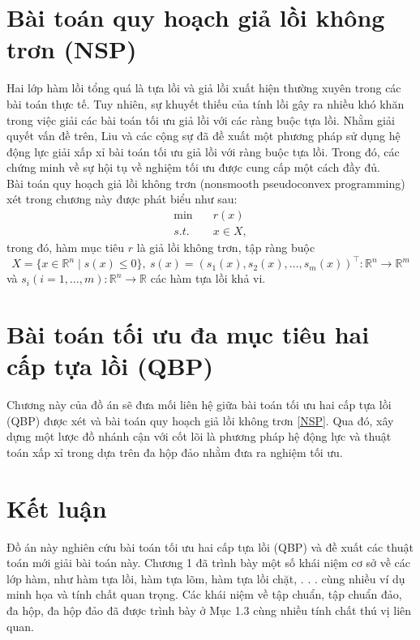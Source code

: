 \documentclass[oneside, a4paper]{book}
\theoremstyle{plain}
\theoremstyle{definition}
\theoremstyle{remark}
\begin{document}
\chapter{Bài toán quy hoạch giả lồi không trơn (NSP)}
Hai lớp hàm lồi tổng quá là tựa lồi và giả lồi xuất hiện thường xuyên trong các bài toán thực tế. Tuy nhiên, sự khuyết thiếu của tính lồi gây ra nhiều khó khăn trong việc giải các bài toán tối ưu giả lồi với các ràng buộc tựa lồi. Nhằm giải quyết vấn đề trên, Liu và các cộng sự \cite{Liu2021} đã đề xuất một phương pháp sử dụng hệ động lực giải xấp xỉ bài toán tối ưu giả lồi với ràng buộc tựa lồi. Trong đó, các chứng minh về sự hội tụ về nghiệm tối ưu được cung cấp một cách đầy đủ. \\
\indent Bài toán quy hoạch giả lồi không trơn (nonsmooth pseudoconvex programming) xét trong chương này được phát biểu như sau:
	\begin{align*}
	\tag*{NSP}
	\label{NSP}
    	\min\quad &r(x)   \\ 
    	s.t. \quad & x \in X,\nonumber 
	\end{align*}
trong đó, hàm mục tiêu $r$ là giả lồi không trơn, tập ràng buộc 
\begin{equation}
	\label{constraints_1}
	X = \{x \in \mathbb{R}^n\mid s(x)\leq 0\},\ s(x)=\left(s_1(x), s_2(x), \ldots, s_m(x)\right)^{\top}:\mathbb{R}^n \rightarrow \mathbb{R}^m
\end{equation}
 và $s_i(i=1, \ldots, m): \mathbb{R}^n \rightarrow \mathbb{R}$ các hàm tựa lồi khả vi.





\chapter{Bài toán tối ưu đa mục tiêu hai cấp tựa lồi (QBP)}
Chương này của đồ án sẽ đưa mối liên hệ giữa bài toán tối ưu hai cấp tựa lồi (QBP) được xét và bài toán quy hoạch giả lồi không trơn \eqref{NSP}. Qua đó, xây dựng một lược đồ nhánh cận với cốt lõi là phương pháp hệ động lực và thuật toán xấp xỉ trong dựa trên đa hộp đảo nhằm đưa ra nghiệm tối ưu.







\chapter*{Kết luận}                         %
Đồ án này nghiên cứu bài toán tối ưu hai cấp tựa lồi
(QBP) và đề xuất các thuật toán mới giải bài toán này.
Chương 1 đã trình bày một số khái niệm cơ sở về các lớp hàm, như
hàm tựa lồi, hàm tựa lõm, hàm tựa lồi chặt, . . . cùng
nhiều ví dụ minh họa và tính chất quan trọng. Các khái niệm về tập
chuẩn, tập chuẩn đảo, đa hộp, đa hộp đảo đã được trình bày ở Mục 1.3
cùng nhiều tính chất thú vị liên quan.
\end{document}
